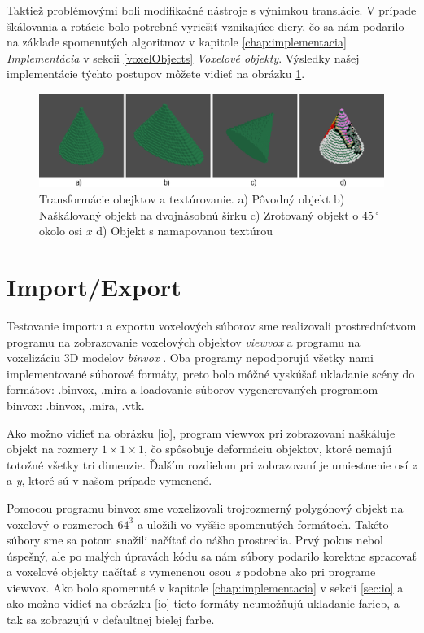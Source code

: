Taktiež problémovými boli modifikačné nástroje s výnimkou translácie. V prípade škálovania a rotácie bolo potrebné vyriešiť vznikajúce diery, čo sa nám podarilo na základe spomenutých algoritmov v kapitole \ref{chap:implementacia} \textit{Implementácia} v sekcii \ref{voxelObjects} \textit{Voxelové objekty}. Výsledky našej implementácie týchto postupov môžete vidieť na obrázku \ref{modif}.
\begin{figure}[ht!]
	\centering
	\includegraphics[width=1.0\textwidth]{modif.jpg}
	\caption[Transformácie obejktov]{Transformácie obejktov a textúrovanie. a) Pôvodný objekt  b) Naškálovaný objekt na dvojnásobnú šírku  c) Zrotovaný objekt o $45\,^{\circ}$ okolo osi $x$  d) Objekt s namapovanou textúrou}
	\label{modif}
\end{figure}

\section{Import/Export}
Testovanie importu a exportu voxelových súborov sme realizovali prostredníctvom programu na zobrazovanie voxelových objektov \textit{viewvox} a programu na voxelizáciu 3D modelov \textit{binvox} \cite{binvox}. Oba programy nepodporujú všetky nami implementované súborové formáty, preto bolo môžné vyskúšať ukladanie scény do formátov: .binvox, .mira a loadovanie súborov vygenerovaných programom binvox: .binvox, .mira, .vtk. 

Ako možno vidieť na obrázku \ref{io}, program viewvox pri zobrazovaní naškáluje objekt na rozmery $1\times1\times1$, čo spôsobuje deformáciu objektov, ktoré nemajú totožné všetky tri dimenzie. Ďalším rozdielom pri zobrazovaní je umiestnenie osí \textit{z} a \textit{y}, ktoré sú v našom prípade vymenené.

Pomocou programu binvox sme voxelizovali trojrozmerný polygónový objekt na voxelový o rozmeroch $64^3$ a uložili vo vyššie spomenutých formátoch. Takéto súbory sme sa potom snažili načítať do nášho prostredia. Prvý pokus nebol úspešný, ale po malých úpravách kódu sa nám súbory podarilo korektne spracovať a voxelové objekty načítať s vymenenou osou \textit{z} podobne ako pri programe viewvox. Ako bolo spomenuté v kapitole \ref{chap:implementacia} v sekcii \ref{sec:io} a ako možno vidieť na obrázku \ref{io} tieto formáty neumožňujú ukladanie farieb, a tak sa zobrazujú v defaultnej bielej farbe. 

